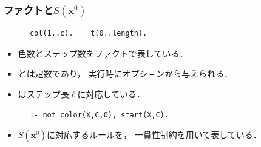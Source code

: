 \documentclass[dvipdfmx,11pt]{beamer}
\begin{document}
\begin{frame}[fragile]\frametitle{ファクトと$S(\bm{x}^0)$}
  
  \begin{exampleblock}{}
    \begin{lstlisting}
      col(1..c).    t(0..length).
    \end{lstlisting}
  \end{exampleblock}
  \begin{itemize}
    \item 色数とステップ数をファクトで表している．
    \item {}とは定数であり，
          実行時にオプションから与えられる．
    \item {}はステップ長$\ell$に対応している．
  \end{itemize}

  \begin{exampleblock}{}
    \centering
    \begin{lstlisting}
      :- not color(X,C,0), start(X,C).
    \end{lstlisting}
  \end{exampleblock}
  \begin{itemize}
    \item $S(\bm{x}^0)$に対応するルールを，
          一貫性制約を用いて表している．
  \end{itemize}

\end{frame}
\end{document}

